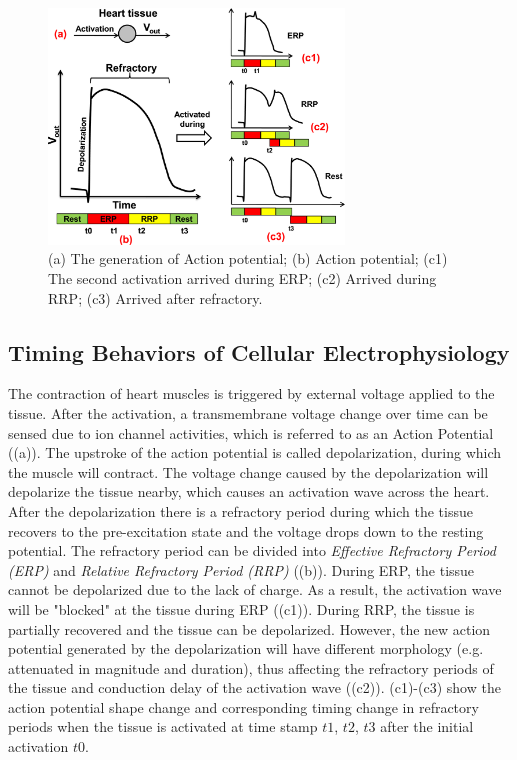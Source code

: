 \begin{figure}[!t]
\center
\includegraphics[width=0.7\textwidth]{figs/refractory.png}
\caption{(a) The generation of Action potential; (b) Action potential; (c1) The second activation arrived during ERP; (c2) Arrived during RRP; (c3) Arrived after refractory.}
\label{fig:refractory}
\end{figure} 
\subsection{Timing Behaviors of Cellular Electrophysiology}
The contraction of heart muscles is triggered by external voltage applied to the tissue. After the activation, a transmembrane voltage change over time can be sensed due to ion channel activities, which is referred to as an Action Potential ((a)). The upstroke of the action potential is called depolarization, during which the muscle will contract. The voltage change caused by the depolarization will depolarize the tissue nearby, which causes an activation wave across the heart. After the depolarization there is a refractory period during which the tissue recovers to the pre-excitation state and the voltage drops down to the resting potential. The refractory period can be divided into \emph{Effective Refractory Period (ERP)} and \emph{Relative Refractory Period (RRP)} ((b)). During ERP, the tissue cannot be depolarized due to the lack of charge. As a result, the activation wave will be "blocked" at the tissue during ERP ((c1)). During RRP, the tissue is partially recovered and the tissue can be depolarized. However, the new action potential generated by the depolarization will have different morphology (e.g. attenuated in magnitude and duration), thus affecting the refractory periods of the tissue and conduction delay of the activation wave ((c2)). (c1)-(c3) show the action potential shape change and corresponding timing change in refractory periods when the tissue is activated at time stamp $t1$, $t2$, $t3$ after the initial activation $t0$. 

